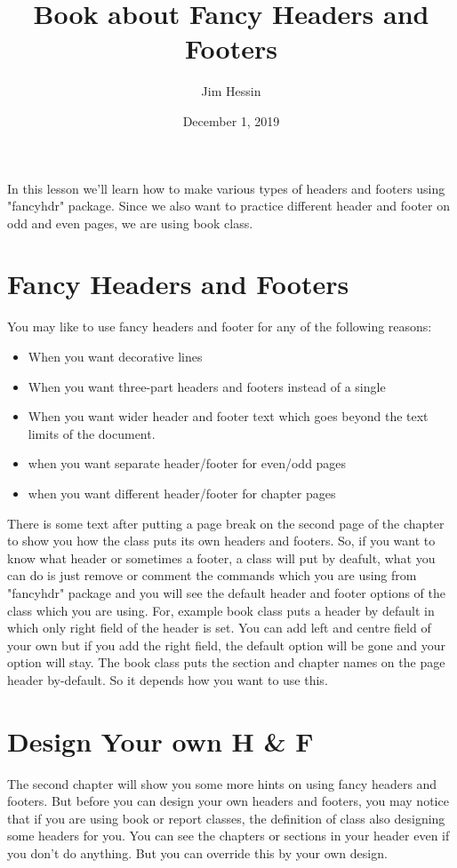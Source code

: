 \documentclass[]{book}
\title{Book about Fancy Headers and Footers}
\author{Jim Hessin}
\date{December  1, 2019}
\begin{document}
\maketitle
In this lesson we'll learn how to make various types of headers and footers using "fancyhdr" package. Since we also want to practice different header and footer on odd and even pages, we are using book class.  
 
 \chapter{Fancy Headers and Footers}

You may like to use fancy headers and footer for any of the following reasons:

\begin{itemize}
\item When you want decorative lines
\item When you want three-part headers and footers instead of a single
\item When you want wider header and footer text which goes beyond the text limits of the document.
\item when you want separate header/footer for even/odd pages
\item when you want different header/footer for chapter pages
\end{itemize}
\pagebreak
There is some text after putting a page break on the second page of the chapter to show you how the class puts its own headers and footers. So, if you want to know what header or sometimes a footer, a class will put by deafult, what you can do is just remove or comment the commands which you are using from "fancyhdr" package and you will see the default header and footer options of the class which you are using. For, example book class puts a header by default in which only right field of the header is set. You can add left and centre field of your own but if you add the right field, the default option will be gone and your option will stay. The book class puts the section and chapter names on the page header by-default. So it depends how you want to use this.
\chapter{Design Your own H \& F}
The second chapter will show you some more hints on using fancy headers and footers. But before you can design your own headers and footers, you may notice that if you are using book or report classes, the definition of class also designing some headers for you. You can see the chapters or sections in your header even if you don't do anything. But you can override this by your own design.
\end{document}
